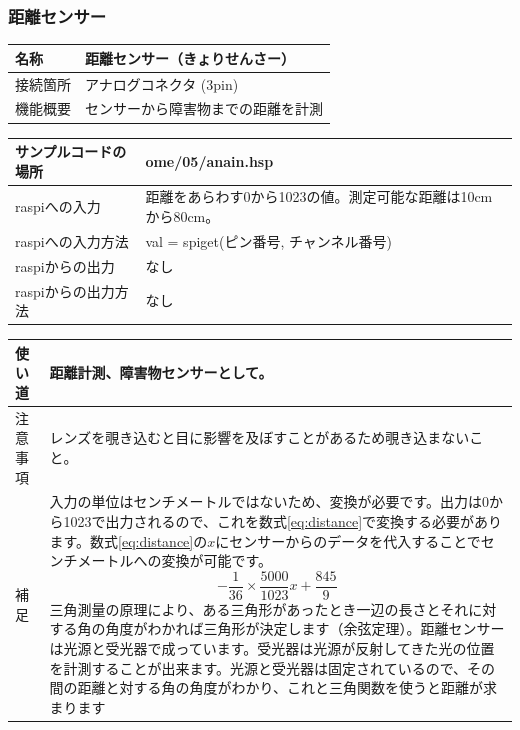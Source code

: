 \subsubsection{距離センサー}\label{distance}
\begin{table}[H]
	\begin{tabular}{|p{\colF}|p{\colG}|} \hline
	名称 & 距離センサー（きょりせんさー）\\ \hline
	接続箇所 & アナログコネクタ (3pin)\\ \hline
	機能概要 & センサーから障害物までの距離を計測\\ \hline
  \end{tabular}
\end{table}

\begin{table}[H]
	\begin{tabular}{|p{\colF}|p{\colG}|}	\hline
	サンプルコードの場所 & ome/05/anain.hsp\\ \hline
	raspiへの入力 & 距離をあらわす0から1023の値。測定可能な距離は10cmから80cm。\\ \hline
	raspiへの入力方法 & val = spiget(ピン番号, チャンネル番号)\\ \hline
	raspiからの出力 & なし\\ \hline
	raspiからの出力方法 & なし\\ \hline
  \end{tabular}
\end{table}

\begin{table}[H]
	\begin{tabular}{|p{\colF}|p{\colG}|} \hline
	使い道 & 距離計測、障害物センサーとして。\\ \hline
	注意事項 & レンズを覗き込むと目に影響を及ぼすことがあるため覗き込まないこと。\\ \hline
	補足 & 入力の単位はセンチメートルではないため、変換が必要です。出力は0から1023で出力されるので、これを数式\ref{eq:distance}で変換する必要があります。数式\ref{eq:distance}の$x$にセンサーからのデータを代入することでセンチメートルへの変換が可能です。
	\begin{equation}
	 -\frac{1}{36} \times \frac{5000}{1023}x + \frac{845}{9}
	 \label{eq:distance}
	\end{equation}
三角測量の原理により、ある三角形があったとき一辺の長さとそれに対する角の角度がわかれば三角形が決定します（余弦定理）。距離センサーは光源と受光器で成っています。受光器は光源が反射してきた光の位置を計測することが出来ます。光源と受光器は固定されているので、その間の距離と対する角の角度がわかり、これと三角関数を使うと距離が求まります\\ \hline
  \end{tabular}
\end{table}

